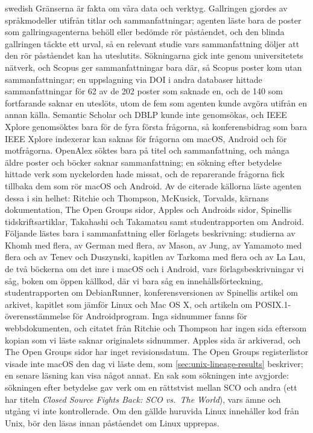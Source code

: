 \begin{onlyin}{swedish}
Gränserna är fakta om våra data och verktyg.
Gallringen gjordes av språkmodeller utifrån titlar och sammanfattningar;
agenten läste bara de poster som gallringsagenterna behöll eller bedömde
rör påståendet, och den blinda gallringen täckte ett urval, så en
relevant studie vars sammanfattning döljer att den rör påståendet kan ha
uteslutits.
Sökningarna gick inte genom universitetets nätverk, och Scopus ger
sammanfattningar bara där, så Scopus poster kom utan sammanfattningar;
en uppslagning via DOI i andra databaser hittade sammanfattningar för 62
av de 202 poster som saknade en, och de 140 som fortfarande saknar en
uteslöts, utom de fem som agenten kunde avgöra utifrån en annan källa.
Semantic Scholar och DBLP kunde inte genomsökas, och IEEE Xplore
genomsöktes bara för de fyra första frågorna, så konferensbidrag som
bara IEEE Xplore indexerar kan saknas för frågorna om macOS, Android och
för motfrågorna.
OpenAlex söktes bara på titel och sammanfattning, och många äldre poster
och böcker saknar sammanfattning; en sökning efter betydelse hittade
verk som nyckelorden hade missat, och de reparerande frågorna fick
tillbaka dem som rör macOS och Android.
Av de citerade källorna läste agenten dessa i sin helhet: Ritchie
och
Thompson, McKusick, Torvalds, kärnans dokumentation, The Open Groups
sidor, Apples och Androids sidor, Spinellis tidskriftsartiklar, Takahashi
och Takamatsu samt studentrapporten om Android.
Följande lästes bara i sammanfattning eller förlagets beskrivning:
studierna av Khomh med flera, av German med flera, av Mason, av Jung, av
Yamamoto med flera och av Tenev och Duszynski, kapitlen av Tarkoma med
flera och av La Lau, de två böckerna om det inre i macOS och i Android,
vars förlagsbeskrivningar vi såg, boken om öppen källkod, där vi bara
såg en innehållsförteckning, studentrapporten om DebianRunner,
konferensversionen av Spinellis artikel om arkivet, kapitlet som jämför
Linux och Mac OS X, och artikeln om POSIX.1-överensstämmelse för
Androidprogram.
Inga sidnummer fanns för webbdokumenten, och citatet från Ritchie och
Thompson har ingen sida eftersom kopian som vi läste saknar originalets
sidnummer.
Apples sida är arkiverad, och The Open Groups sidor har inget
revisionsdatum.
The Open Groups registerlistor visade inte macOS den dag vi läste dem,
som \cref{sec:unix-lineage-results} beskriver; en senare läsning kan
visa något annat.
En sak som sökningen inte avgjorde: sökningen efter betydelse gav verk
om en rättstvist mellan SCO och andra (ett har titeln \emph{Closed
Source Fights Back: SCO vs.\ The World}), vars ämne och utgång vi inte
kontrollerade.
Om den gällde huruvida Linux innehåller kod från Unix, bör den läsas
innan påståendet om Linux upprepas.
\end{onlyin}

